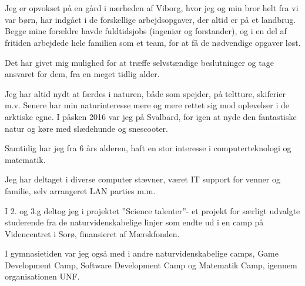 \\



\\
Jeg er opvokset på en gård i nærheden af Viborg, hvor jeg og min bror helt fra vi var børn, har indgået i de forskellige arbejdsopgaver, der altid er på et landbrug. Begge mine forældre havde fuldtidsjobs (ingeniør og forstander), og i en del af fritiden arbejdede hele familien som et team, for at få de nødvendige opgaver løst. 

Det har givet mig mulighed for at træffe selvstændige beslutninger og tage ansvaret for dem, fra en meget tidlig alder. 

Jeg har altid nydt at færdes i naturen, både som spejder, på teltture, skiferier m.v. 
Senere har min naturinteresse mere og mere rettet sig mod oplevelser i de arktiske egne. 
I påsken 2016 var jeg på Svalbard, for igen at nyde den fantastiske natur og køre med slædehunde og snescooter.  

Samtidig har jeg fra 6 års alderen, haft en stor interesse i computerteknologi og matematik. 

Jeg har deltaget i diverse computer stævner, været IT support for venner og familie, selv arrangeret LAN parties m.m. 

I 2. og 3.g deltog jeg i projektet ”Science talenter”- et projekt for særligt udvalgte studerende fra de naturvidenskabelige linjer som endte ud i en camp på Videncentret i Sorø, finansieret af Mærskfonden.

I gymnasietiden var jeg også med i andre naturvidenskabelige camps, Game Development Camp, Software Development Camp og Matematik Camp, igennem organisationen UNF. 
